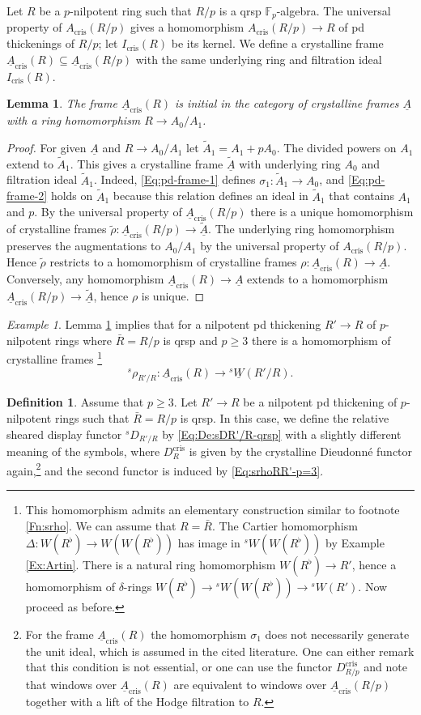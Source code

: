 \documentclass[a4paper,11pt]{amsart}
\theoremstyle{plain}
\newtheorem{Lemma}[equation]{Lemma}
\theoremstyle{definition}
\newtheorem{Defn}[equation]{Definition}
\theoremstyle{remark}
\newtheorem{Example}[equation]{Example}
\newcommand{\bLe}{\begin{Lemma}}
\newcommand{\eLe}{\end{Lemma}}
\newcommand{\bDe}{\begin{Defn}}
\newcommand{\eDe}{\end{Defn}}
\newcommand{\bEx}{\begin{Example}}
\newcommand{\eEx}{\end{Example}}
\newcommand{\bproof}{\begin{proof}}
\newcommand{\eproof}{\end{proof}}
\newcommand{\beqn}{\begin{equation}}
\newcommand{\eeqn}{\end{equation}}
\renewcommand{\u}{\underline}
\numberwithin{equation}{section}
\newcommand{\FF}{{\mathbb{F}}}
\DeclareMathOperator{\crys}{cris}
\newcommand{\sD}{{}^{s\!}D}
\newcommand{\sW}{{}^sW}
\newcommand{\usW}{{}^s\u W}
\newcommand{\srho}{{}^{s\!}\rho}
\begin{document}
Let $R$ be a $p$-nilpotent ring such that $R/p$ is a qrsp $\FF_p$-algebra. The universal property of $A_{\crys}(R/p)$ gives a homomorphism  $A_{\crys}(R/p)\to R$ of pd thickenings of $R/p$; let $I_{\crys}(R)$ be its kernel. We define a crystalline frame $\u A_{\crys}(R)\subseteq\u A_{\crys}(R/p)$ with the same underlying ring and filtration ideal $I_{\crys}(R)$.

\bLe
\label{Le:Acris-initial-pd-frame-p-nilp}
The frame $\u A_{\crys}(R)$ is initial in the category of crystalline frames $\u A$ with a ring homomorphism $R\to A_0/A_1$.
\eLe

\bproof
For given $\u A$ and $R\to A_0/A_1$ let $\tilde A_1=A_1+pA_0$. The divided powers on $A_1$ extend to $\tilde A_1$. This gives a crystalline frame $\u{\tilde A}$ with underlying ring $A_0$ and filtration ideal $\tilde A_1$. Indeed, \eqref{Eq:pd-frame-1} defines $\sigma_1\colon\tilde A_1\to A_0$, and \eqref{Eq:pd-frame-2} holds on $\tilde A_1$ because this relation defines an ideal in $\tilde A_1$ that contains $A_1$ and $p$. By the universal property of $\u A_{\crys}(R/p)$ there is a unique homomorphism of crystalline frames $\tilde\rho\colon\u A_{\crys}(R/p)\to\u{\tilde A}$. The underlying ring homomorphism preserves the augmentations to $A_0/A_1$ by the universal property of $A_{\crys}(R/p)$. Hence $\tilde\rho$ restricts to a homomorphism of crystalline frames $\rho\colon\u A_{\crys}(R)\to\u A$. Conversely, any homomorphism $\u A_{\crys}(R)\to\u A$ extends to a homomorphism $\u A_{\crys}(R/p)\to\u{\tilde A}$, hence $\rho$ is unique.
\eproof

\bEx
Lemma \ref{Le:Acris-initial-pd-frame-p-nilp} implies that for a nilpotent pd thickening $R'\to R$ of $p$-nilpotent rings where $\bar R=R/p$ is qrsp and $p\ge 3$ there is a homomorphism of crystalline frames%
\footnote{This homomorphism admits an elementary construction similar to footnote \ref{Fn:srho}. We can assume that $R=\bar R$. The Cartier homomorphism $\Delta\colon W(R^\flat)\to W(W(R^\flat))$ has image in $\sW(W(R^\flat))$ by Example \ref{Ex:Artin}. There is a natural ring homomorphism $W(R^\flat)\to R'$, hence a homomorphism of $\delta$-rings $W(R^\flat)\to\sW(W(R^\flat))\to\sW(R')$. Now proceed as before.}
\beqn
\label{Eq:srhoRR'-p=3}
\srho_{R'/R}\colon\u A_{\crys}(R)\to\usW(R'/R).
\eeqn
\eEx

\bDe
\label{De:sDR'/R-qrsp-p3}
Assume that $p\ge 3$. Let $R'\to R$ be a nilpotent pd thickening of $p$-nilpotent rings such that $\bar R=R/p$ is qrsp. In this case, we define the relative sheared display functor $\sD_{R'/R}$ by \eqref{Eq:De:sDR'/R-qrsp} with a slightly different meaning of the symbols,
where $D^{\crys}_R$ is given by the crystalline Dieudonn\'e functor again,\footnote{For the frame $\u A_{\crys}(R)$ the homomorphism $\sigma_1$ does not necessarily generate the unit ideal, which is assumed in the cited literature. One can either remark that this condition is not essential, or one can use the functor $D^{\crys}_{R/p}$ and note that windows over $\u A_{\crys}(R)$ are equivalent to windows over $\u A_{\crys}(R/p)$ together with a lift of the Hodge filtration to $R$.} 
and the second functor is induced by \eqref{Eq:srhoRR'-p=3}.
\eDe
\end{document}
